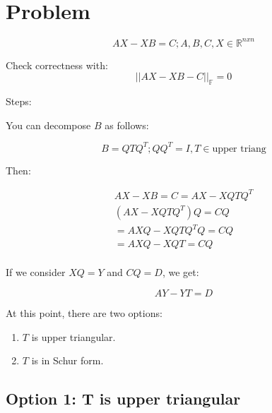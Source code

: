 \documentclass[]{article}
\title{}
\author{}
\begin{document}
\maketitle

\begin{abstract}

\end{abstract}

\section{Problem}

\begin{equation}
AX-XB = C; A,B,C,X \in \mathbb{R}^{nxn}
\end{equation}

Check correctness with:
\begin{equation}
||AX-XB - C||_{\mathbb{F}} = 0
\end{equation}

Steps:

You can decompose $B$ as follows:

\begin{equation}
B = QTQ^{T}; QQ^{T} = I, T \in \text{upper triang}
\end{equation}

Then:

\begin{gather}
AX-XB = C = AX-XQTQ^{T}\\ 
(AX-XQTQ^{T})Q = CQ \\	
= AXQ-XQTQ^{T}Q = CQ \\
= AXQ-XQT= CQ \\
\end{gather}

If we consider $XQ = Y$ and $CQ = D$, we get:

\begin{equation}
AY-YT = D
\end{equation}

At this point, there are two options:

\begin{enumerate}
	\item $T$ is upper triangular.
	\item $T$ is in Schur form.
\end{enumerate}

\subsection{Option 1: T is upper triangular}
\end{document}
